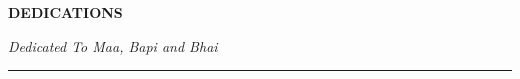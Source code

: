 \begin{center}
	{\large\textbf{DEDICATIONS}}
\end{center}
\vspace*{3.0in}
\hspace*{2.0in}
\begin{center}
        {\Large \emph{Dedicated To Maa, Bapi and Bhai}\\}
\hrule
\end{center}
